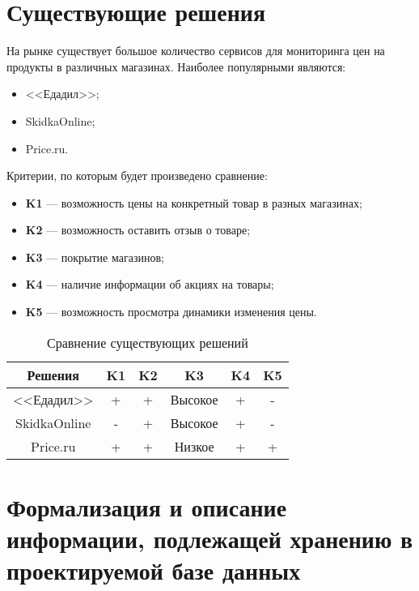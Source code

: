 \section{Существующие решения}

На рынке существует большое количество сервисов для мониторинга цен на продукты в различных магазинах. Наиболее популярными являются:

\begin{itemize}[label=--]
	\item <<Едадил>>;
	\item SkidkaOnline;
	\item Price.ru.
\end{itemize}

Критерии, по которым будет произведено сравнение:

\begin{itemize}[label=--]
	\item \textbf{K1} --- возможность цены на конкретный товар в разных магазинах;
	\item \textbf{K2} --- возможность оставить отзыв о товаре;
	\item \textbf{K3} --- покрытие магазинов;
	\item \textbf{K4} --- наличие информации об акциях на товары;
	\item \textbf{K5} --- возможность просмотра динамики изменения цены.
\end{itemize}

\clearpage

\begin{table}[ht]
	\begin{center}
		\begin{threeparttable}
			\caption{Сравнение существующих решений}
			\label{tbl:exist_sol}
			\begin{tabular}{|c|c|c|c|c|c|}
				\hline
				\textbf{Решения} & \textbf{K1} & \textbf{K2} & \textbf{K3} & \textbf{K4} & \textbf{K5} \\
				\hline
				<<Едадил>> & + & + & Высокое & + & - \\
				\hline
				SkidkaOnline & - & + & Высокое & + & - \\
				\hline
				Price.ru & + & + & Низкое & + & + \\
				\hline
			\end{tabular}
		\end{threeparttable}			
	\end{center}
\end{table}

\section{Формализация и описание информации, подлежащей хранению в проектируемой базе данных}

